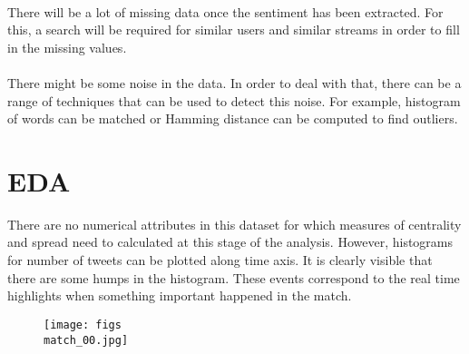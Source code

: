 \documentclass[11pt]{article}
\begin{document}
\paragraph{}
There will be a lot of missing data once the sentiment has been extracted. For this, a search will be required for similar users and similar streams in order to fill in the missing values.
\paragraph{}
There might be some noise in the data. In order to deal with that, there can be a range of techniques that can be used to detect this noise. For example, histogram of words can be matched or Hamming distance can be computed to find outliers.

\section{EDA}
There are no numerical attributes in this dataset for which measures of centrality and spread need to calculated at this stage of the analysis. However, histograms for number of tweets can be plotted along time axis. It is clearly visible that there are some humps in the histogram. These events correspond to the real time highlights when something important happened in the match.

\begin{figure}
	\texttt{[image: figs\\match\_00.jpg]}
\end{figure}
\end{document}
